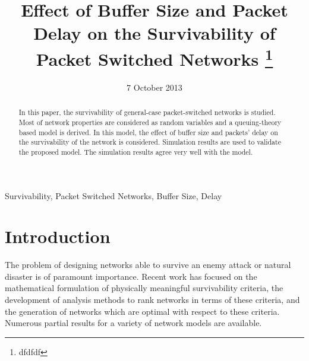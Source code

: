 \documentclass[conference]{IEEEtran}
\begin{document}
    \title{Effect of Buffer Size and Packet Delay on the Survivability of Packet Switched Networks \footnote{dfdfdf}}
    \date{7 October 2013}
    \author{
    \and
    }

    \maketitle

    \begin{abstract}
        In this paper, the survivability of general-case packet-switched networks is studied. Most of network properties are considered as random variables and a queuing-theory based model is derived. In this model, the effect of buffer size and packets' delay on the survivability of the network is considered. Simulation results are used to validate the proposed model. The simulation results agree very well with the model.
    \end{abstract}

    \begin{IEEEkeywords}
        Survivability, Packet Switched Networks, Buffer Size, Delay
    \end{IEEEkeywords}

    \section{Introduction} \label{sec:intro}
    The problem of designing networks able to survive an enemy attack or natural disaster is of paramount importance. Recent work has focused on the mathematical formulation of physically meaningful survivability criteria, the development of analysis methods to rank networks in terms of these criteria, and the generation of networks which are optimal with respect to these criteria. Numerous partial results for a variety of network models are available.
\end{document}
